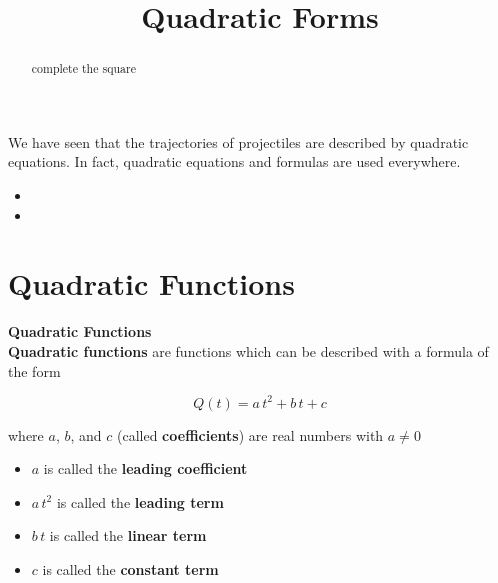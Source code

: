 \documentclass{ximera}
\title{Quadratic Forms}
\begin{document}
\begin{abstract}
complete the square
\end{abstract}
\maketitle



We have seen that the trajectories of projectiles are described by quadratic equations.  In fact, quadratic equations and formulas are used everywhere.


\begin{itemize}
\item {}
\item {}
\end{itemize}







\section{Quadratic Functions}


\begin{definition} \textbf{\textcolor{green!50!black}{Quadratic Functions}} \\
\textbf{Quadratic functions} are functions which can be described with a formula of the form

\[  Q(t) = a \, t^2 + b \, t + c  \]

where $a$, $b$, and $c$ (called \textbf{coefficients}) are real numbers with $a \ne 0$



\begin{itemize}
\item $a$ is called the \textbf{leading coefficient} 
\item $a \, t^2$ is called the \textbf{leading term} 
\item $b \, t$ is called the \textbf{linear term} 
\item $c$ is called the \textbf{constant term} 
\end{itemize}

\end{definition}
\end{document}
